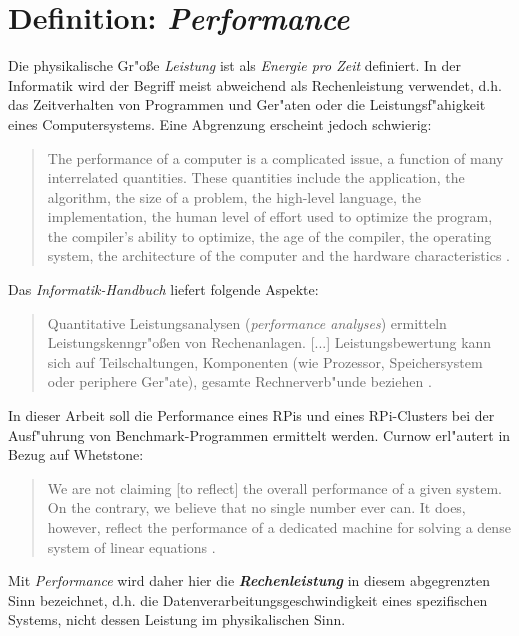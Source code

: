 \section{Definition: \textit{Performance}}\label{Performance}

Die physikalische Gr"o\ss e \textit{Leistung} ist als \textit{Energie pro Zeit} definiert. In der Informatik wird der Begriff meist abweichend als Rechenleistung verwendet, d.h. das Zeitverhalten von Programmen und Ger"aten oder die Leistungsf"ahigkeit eines Computersystems. Eine Abgrenzung erscheint jedoch schwierig: 
\begin{quote}
\onehalfspacing
The performance of a computer is a complicated issue, a function of many interrelated quantities. These quantities include the application, the algorithm, the size of a problem, the high-level language, the implementation, the human level of effort used to optimize the program, the compiler's ability to optimize, the age of the compiler, the operating system, the architecture of the computer and the hardware characteristics \cite{don03}.
\end{quote}
Das \textit{Informatik-Handbuch} liefert folgende Aspekte:
\begin{quote} 
\onehalfspacing
Quantitative Leistungsanalysen (\textit{performance analyses}) ermitteln Leistungskenngr"o\ss en von Rechenanlagen. [...] Leistungsbewertung kann sich auf Teilschaltungen, Komponenten (wie Prozessor, Speichersystem oder periphere Ger"ate), gesamte Rechnerverb"unde beziehen \cite{rec06}.
\end{quote}
In dieser Arbeit soll die Performance eines RPis und eines RPi-Clusters bei der Ausf"uhrung von Benchmark-Programmen ermittelt werden. Curnow erl"autert in Bezug auf Whetstone: 
\begin{quote}
\onehalfspacing
We are not claiming [to reflect] the overall performance of a given system. On the contrary, we believe that no single number ever can. It does, however, reflect the performance of a dedicated machine for solving a dense system of linear equations \cite{cur76}.
\end{quote}
Mit \textit{Performance} wird daher hier die \textbf{\textit{Rechenleistung}} in diesem abgegrenzten Sinn bezeichnet, d.h. die Datenverarbeitungsgeschwindigkeit eines spezifischen Systems, nicht dessen Leistung im physikalischen Sinn. 

